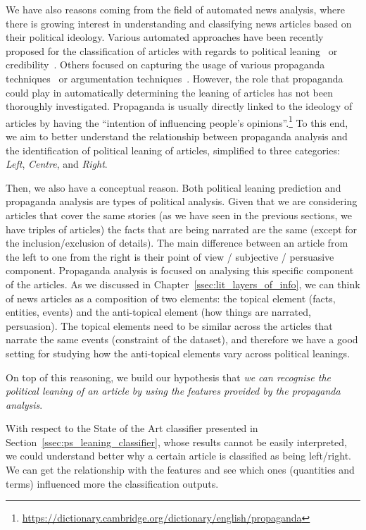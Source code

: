We have also reasons coming from the field of automated news analysis, where there is growing interest in understanding and classifying news articles based on their political ideology.
Various automated approaches have been recently proposed for the classification of articles with regards to political leaning~\cite{baly2020we} or credibility~\cite{horne2018assessing}. Others focused on capturing the usage of various propaganda techniques~\cite{da2019fine} or argumentation techniques~\cite{lippi2016argumentation}. However, the role that propaganda could play in automatically determining the leaning of articles has not been thoroughly investigated.
Propaganda is usually directly linked to the ideology of articles by having the ``intention of influencing people's opinions''.\footnote{\url{https://dictionary.cambridge.org/dictionary/english/propaganda}} To this end, we aim to better understand the relationship between propaganda analysis and the identification of political leaning of articles, simplified to three categories: \textit{Left}, \textit{Centre}, and \textit{Right}.

Then, we also have a conceptual reason. Both political leaning prediction and propaganda analysis are types of political analysis.
Given that we are considering articles that cover the same stories (as we have seen in the previous sections, we have triples of articles) the facts that are being narrated are the same (except for the inclusion/exclusion of details). The main difference between an article from the left to one from the right is their point of view / subjective / persuasive component. Propaganda analysis is focused on analysing this specific component of the articles.
As we discussed in Chapter~\ref{ssec:lit_layers_of_info}, we can think of news articles as a composition of two elements: the topical element (facts, entities, events) and the anti-topical element (how things are narrated, persuasion).
The topical elements need to be similar across the articles that narrate the same events (constraint of the dataset), and therefore we have a good setting for studying how the anti-topical elements vary across political leanings. 

On top of this reasoning, we build our hypothesis that \emph{we can recognise the political leaning of an article by using the features provided by the propaganda analysis}.

With respect to the State of the Art classifier presented in Section~\ref{ssec:ps_leaning_classifier}, whose results cannot be easily interpreted, we could understand better why a certain article is classified as being left/right. We can get the relationship with the features and see which ones (quantities and terms) influenced more the classification outputs. 



